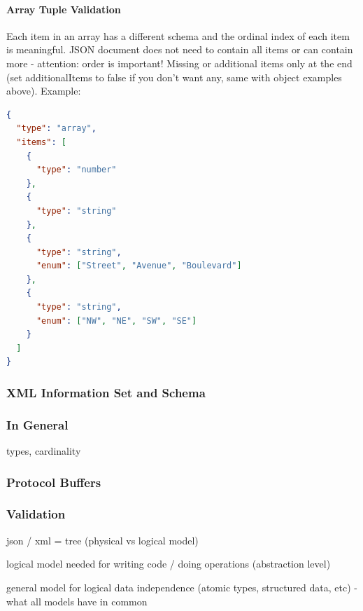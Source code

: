 \paragraph{Array Tuple Validation}
Each item in an array has a different schema and the ordinal index of each item is meaningful. JSON document does not need to contain all items or can contain more - attention: order is important! Missing or additional items only at the end (set additionalItems to false if you don't want any, same with object examples above). Example:

\begin{lstlisting}[language=json,firstnumber=1]
{
  "type": "array",
  "items": [
    {
      "type": "number"
    },
    {
      "type": "string"
    },
    {
      "type": "string",
      "enum": ["Street", "Avenue", "Boulevard"]
    },
    {
      "type": "string",
      "enum": ["NW", "NE", "SW", "SE"]
    }
  ]
}
\end{lstlisting}






\subsubsection{XML Information Set and Schema}





\subsubsection{In General}
types, cardinality

\subsubsection{Protocol Buffers}

\subsubsection{Validation}






json / xml = tree (physical vs logical model)

logical model needed for writing code / doing operations (abstraction level)

general model for logical data independence (atomic types, structured data, etc) - what all models have in common

